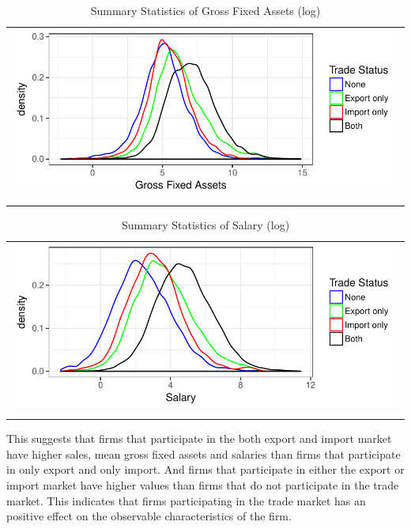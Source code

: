 \documentclass[12pt]{article}
\begin{document}

\begin{center}
\begin{table}[H]
\caption{Summary Statistics of Gross Fixed Assets (log)}
\label{lgfa}
\begin{tabular}{c}
 \includegraphics{./PICS/denslgfa.pdf}   \\ 
   \\  
\end{tabular}
\end{table}
\end{center}



\begin{center}
\begin{table}[H]
\caption{Summary Statistics of Salary (log)}
\label{tab:lsalary}
\begin{tabular}{c}
 \includegraphics{./PICS/denslsalary.pdf}   \\ 
   \\  
\end{tabular}
\end{table}
\end{center}
 \restoregeometry


This suggests that firms that participate in the both export and import market have
higher sales, mean gross fixed assets and 
salaries  than firms that participate in
only export and only import.  And firms that participate in either the
export or import market have higher values  than firms that do not
participate in the trade market. This indicates that firms participating
in the trade market has an positive effect on the observable
characteristics of the firm.
\end{document}
